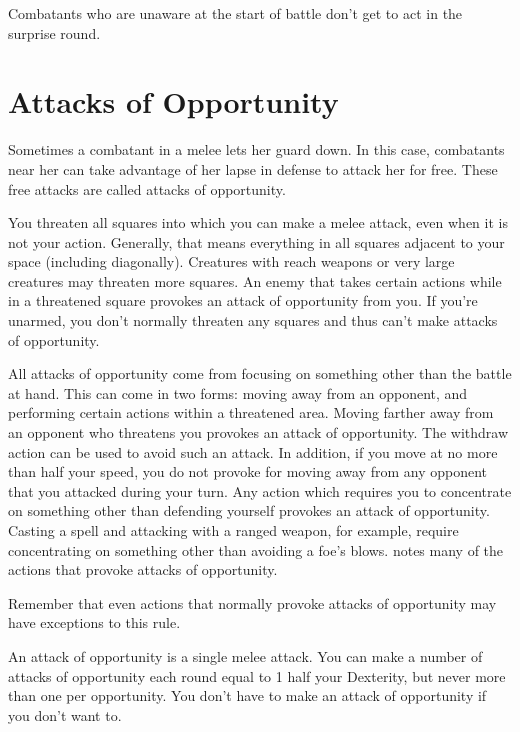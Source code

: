  Combatants who are unaware at the start of battle don't get to act in the surprise round.

\section{Attacks of Opportunity}
Sometimes a combatant in a melee lets her guard down. In this case, combatants near her can take advantage of her lapse in defense to attack her for free. These free attacks are called attacks of opportunity.

 You threaten all squares into which you can make a melee attack, even when it is not your action. Generally, that means everything in all squares adjacent to your space (including diagonally). Creatures with reach weapons or very large creatures may threaten more squares. An enemy that takes certain actions while in a threatened square provokes an attack of opportunity from you. If you're unarmed, you don't normally threaten any squares and thus can't make attacks of opportunity.

 All attacks of opportunity come from focusing on something other than the battle at hand. This can come in two forms: moving away from an opponent, and performing certain actions within a threatened area.
 Moving farther away from an opponent who threatens you provokes an attack of opportunity. The withdraw action can be used to avoid such an attack. In addition, if you move at no more than half your speed, you do not provoke for moving away from any opponent that you attacked during your turn.
 Any action which requires you to concentrate on something other than defending yourself provokes an attack of opportunity. Casting a spell and attacking with a ranged weapon, for example, require concentrating on something other than avoiding a foe's blows.  notes many of the actions that provoke attacks of opportunity.

\par Remember that even actions that normally provoke attacks of opportunity may have exceptions to this rule.

 An attack of opportunity is a single melee attack. You can make a number of attacks of opportunity each round equal to 1 \add half your Dexterity, but never more than one per opportunity. You don't have to make an attack of opportunity if you don't want to.

